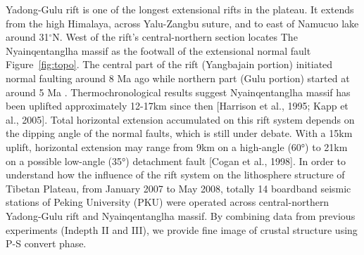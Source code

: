 Yadong-Gulu rift is one of the longest extensional rifts in the plateau. It extends from the high Himalaya, across Yalu-Zangbu suture, and to east of Namucuo lake around 31$^\circ$N. West of the rift's central-northern section locates The Nyainqentanglha massif as the footwall of the extensional normal fault Figure~\ref{fig:topo}. 
The central part of the rift (Yangbajain portion) initiated normal faulting around 8 Ma ago while northern part (Gulu portion) started at around 5 Ma \cite{Harrison_1995,stockli2002late}. Thermochronological results suggest Nyainqentanglha massif has been uplifted approximately 12-17km since then [Harrison et al., 1995; Kapp et al., 2005]. Total horizontal extension accumulated on this rift system depends on the dipping angle of the normal faults, which is still under debate. With a 15km uplift, horizontal extension may range from 9km on a high-angle (60°) to 21km on a possible low-angle (35°) detachment fault [Cogan et al., 1998]. 
In order to understand how the influence of the rift system on the lithosphere structure of Tibetan Plateau, from January 2007 to May 2008, totally 14 boardband seismic stations of Peking University (PKU) were operated across central-northern Yadong-Gulu rift and Nyainqentanglha massif. By combining data from previous experiments (Indepth II and III), we provide fine image of crustal structure using P-S convert phase.

